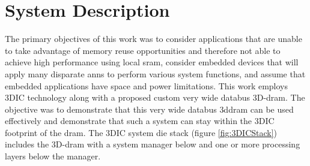 \documentclass[journal]{IEEEtran}
\begin{document}
\section{System Description}
\label{System Description}


The primary objectives of this work was to consider applications that are unable to take advantage of memory reuse opportunities and therefore not able to achieve high performance using local \ac{sram},
consider embedded devices that will apply many disparate \acp{ann} to perform various system functions, and assume that embedded applications have space and power limitations.
This work employs 3DIC technology along with a proposed custom very wide databus 3D-\ac{dram}.
The objective was to demonstrate that this very wide databus \ac{3ddram} can be used effectively and demonstrate that such a system can stay within the 3DIC footprint of the \ac{dram}.
The 3DIC system die stack (figure \ref{fig:3DICStack}) includes the 3D-\ac{dram} with a system manager below and one or more processing layers below the manager.
\end{document}
